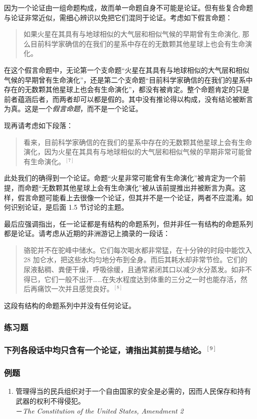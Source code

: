 因为一个论证由一组命题构成，故而单一命题自身不可能是论证。但有些复合命题与论证非常近似，需细心辨识以免把它们混同于论证。考虑如下假言命题：
\begin{quote}
如果火星在其具有与地球相似的大气层和相似气候的早期曾有生命演化, 那么目前科学家确信的在我们的星系中存在的无数颗其他星球上也会有生命演化。
\end{quote}
在这个假言命题中，无论第一个支命题“火星在其具有与地球相似的大气层和相似气候的早期曾有生命演化”，还是第二个支命题“目前科学家确信的在我们的星系中存在的无数颗其他星球上也会有生命演化”，都没有被肯定。整个命题肯定的只是前者蕴涵后者，而两者却可以都是假的。其中没有推论得以构成，没有结论被断言为真。这是一个\emph{假言命题}，而不是一个论证。

现再请考虑如下段落：
\begin{quote}
看来，目前科学家确信的在我们的星系中存在的无数颗其他星球上会有生命演化，因为火星在其具有与地球相似的大气层和相似气候的早期非常可能曾有生命演化。${ }^{[7]}$
\end{quote}
此处我们的确得到一个论证。命题“火星非常可能曾有生命演化”被肯定为一个前提，而命题“无数颗其他星球上会有生命演化”被从该前提推出并被断言为真。这样，假言命题可能看上去很像一个论证，但其并不是一个论证，两者不应混淆。如何识别论证，是后面 1.5 节讨论的主题。

最后应强调指出，任一论证都是有结构的命题系列，但并非任一有结构的命题系列都是论证。请考虑从近期的非洲游记上摘录的一段话：
\begin{quote}
骆驼并不在驼峰中储水。它们每次喝水都非常猛，在十分钟的时段中能饮入 28 加仑水，把这些水均匀地分布到全身。而后其耗水却非常节俭。它们的尿液黏稠、粪便干燥，呼吸徐缓，且通常紧闭其口以减少水分蒸发。如非不得已，它们一般不出汗……在失水程度达到体重的三分之一时也能存活，然后再痛饮一次并且感觉良好。${ }^{[8]}$
\end{quote}
这段有结构的命题系列中并没有任何论证。

\subsubsection{练习题}
\subsubsection*{下列各段话中均只含有一个论证，请指出其前提与结论。${ }^{[9]}$}

\subsubsection*{例题}
\begin{enumerate}[label=\arabic*., itemsep=1ex, topsep=1ex]
\item 管理得当的民兵组织对于一个自由国家的安全是必需的，因而人民保存和持有武器的权利不得侵犯。\\
    \null\hspace{\parindent}－\textit{The Constitution of the United States, Amendment 2}
\end{enumerate}

